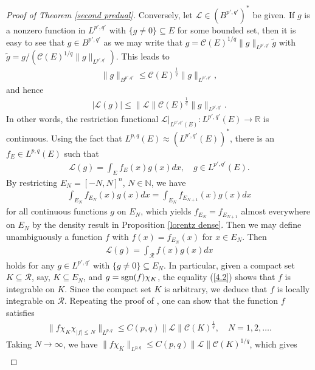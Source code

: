 \documentclass[10pt,reqno]{amsart}
\numberwithin{equation}{section}
\begin{document}
\begin{proof}[Proof of Theorem \ref{second predual}]
Conversely, let $\mathcal{L}\in(B^{p',q'})^{\ast}$ be given. If $g$ is a nonzero function in $L^{p',q'}$ with $\{g\ne 0\}\subseteq E$ for some bounded set, then it is easy to see that $g\in B^{p',q'}$ as we may write that $g=\mathcal{C}(E)^{1/q}\|g\|_{L^{p',q'}}\widetilde{g}$ with $\widetilde{g}=g/(\mathcal{C}(E)^{1/q}\|g\|_{L^{p',q'}})$. This leads to 
\begin{align*}
\|g\|_{B^{p',q'}}\leq\mathcal{C}(E)^{\frac{1}{q}}\|g\|_{L^{p',q'}},
\end{align*}
and hence 
\begin{align*}
|\mathcal{L}(g)|\leq\|\mathcal{L}\|\mathcal{C}(E)^{\frac{1}{q}}\|g\|_{L^{p',q'}}.
\end{align*}
In other words, the restriction functional $\mathcal{L}|_{L^{p',q'}(E)}:L^{p',q'}(E)\rightarrow\mathbb{R}$ is continuous. Using the fact that $L^{p,q}(E)\approx(L^{p',q'}(E))^{\ast}$, there is an $f_{E}\in L^{p,q}(E)$ such that 
\begin{align*}
\mathcal{L}(g)=\int_{E}f_{E}(x)g(x)dx,\quad g\in L^{p',q'}(E).
\end{align*}
By restricting $E_{N}=[-N,N]^{n}$, $N\in\mathbb{N}$, we have
\begin{align*}
\int_{E_{N}}f_{E_{N}}(x)g(x)dx=\int_{E_{N}}f_{E_{N+1}}(x)g(x)dx
\end{align*}
for all continuous functions $g$ on $E_{N}$, which yields $f_{E_{N}}=f_{E_{N+1}}$ almost everywhere on $E_{N}$ by the density result in Proposition \ref{lorentz dense}. Then we may define unambiguously a function $f$ with $f(x)=f_{E_{N}}(x)$ for $x\in E_{N}$. Then 
\begin{align}\label{4.2}
\mathcal{L}(g)=\int_{\mathcal{R}}f(x)g(x)dx
\end{align}
holds for any $g\in L^{p',q'}$ with $\{g\ne 0\}\subseteq E_{N}$. In particular, given a compact set $K\subseteq\mathcal{R}$, say, $K\subseteq E_{N}$, and $g={\rm sgn}(f)\chi_{K}$, the equality (\ref{4.2}) shows that $f$ is integrable on $K$. Since the compact set $K$ is arbitrary, we deduce that $f$ is locally integrable on $\mathcal{R}$. Repeating the proof of \cite[Theorem 1.4.16 (vi)]{GL}, one can show that the function $f$ satisfies 
\begin{align*}
\|f\chi_{K}\chi_{|f|\leq N}\|_{L^{p,q}}\leq C(p,q)\|\mathcal{L}\|\mathcal{C}(K)^{\frac{1}{q}},\quad N=1,2,\ldots.
\end{align*}
Taking $N\rightarrow\infty$, we have $\|f\chi_{K}\|_{L^{p,q}}\leq C(p,q)\|\mathcal{L}\|\mathcal{C}(K)^{1/q}$, which gives 
\begin{align}\label{norm dual}

\end{align}
\end{proof}
\end{document}
